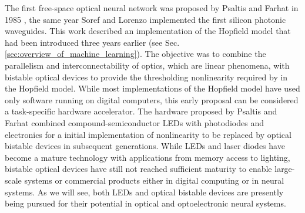 The first free-space optical neural network was proposed by Psaltis and Farhat in 1985 \cite{psfa1985}, the same year Soref and Lorenzo implemented the first silicon photonic waveguides. This work described an implementation of the Hopfield model that had been introduced three years earlier (see Sec.\,\ref{sec:overview_of_machine_learning}). The objective was to combine the parallelism and interconnectability of optics, which are linear phenomena, with bistable optical devices to provide the thresholding nonlinearity required by in the Hopfield model. While most implementations of the Hopfield model have used only software running on digital computers, this early proposal can be considered a task-specific hardware accelerator. The hardware proposed by Psaltis and Farhat combined compound-semiconductor LEDs with photodiodes and electronics for a initial implementation of nonlinearity to be replaced by optical bistable devices in subsequent generations. While LEDs and laser diodes have become a mature technology with applications from memory access to lighting, bistable optical devices have still not reached sufficient maturity to enable large-scale systems or commercial products either in digital computing or in neural systems. As we will see, both LEDs and optical bistable devices are presently being pursued for their potential in optical and optoelectronic neural systems.

